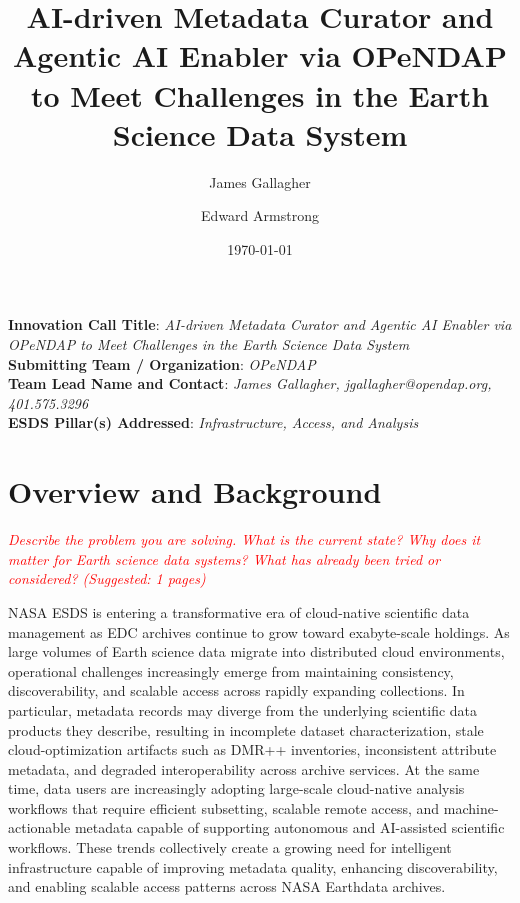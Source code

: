 \documentclass[11pt]{article}
\title{AI-driven Metadata Curator and Agentic AI Enabler via OPeNDAP to Meet Challenges in the Earth Science Data System}
\author[1]{James Gallagher}
\author[2]{Edward Armstrong}
\affil[1]{OPeNDAP, Butte, MT}
\affil[2]{NASA JPL PODAAC, Pasadena, CA}
\date{\today}
\begin{document}
% 


\lstset{basicstyle=\footnotesize\ttfamily,breaklines=true}
\lstset{framextopmargin=5pt,frame=single}

\begin{flushleft}
\noindent \textbf{Innovation Call Title}: {\em AI-driven Metadata Curator and Agentic AI Enabler via OPeNDAP to Meet Challenges in the Earth Science Data System}\\
\textbf{Submitting Team / Organization}: {\em OPeNDAP}\\
\textbf{Team Lead Name and Contact}: {\em James Gallagher, jgallagher@opendap.org, 401.575.3296}\\
\textbf{ESDS Pillar(s) Addressed}: {\em Infrastructure, Access, and Analysis}\\
\end{flushleft}


\section{Overview and Background}
\textcolor{red}{\textit{Describe the problem you are solving. What is the current state? Why does it matter for Earth science data systems? What has already been tried or considered? (Suggested: 1 pages)}}

\ac{NASA} \ac{ESDS} is entering a transformative era of cloud-native scientific data management as \ac{EDC} archives continue to grow toward exabyte-scale holdings. As large volumes of Earth science data migrate into distributed cloud environments, operational challenges increasingly emerge from maintaining consistency, discoverability, and scalable access across rapidly expanding collections. In particular, metadata records may diverge from the underlying scientific data products they describe, resulting in incomplete dataset characterization, stale cloud-optimization artifacts such as \ac{DMR++} inventories, inconsistent attribute metadata, and degraded interoperability across archive services. At the same time, data users are increasingly adopting large-scale cloud-native analysis workflows that require efficient subsetting, scalable remote access, and machine-actionable metadata capable of supporting autonomous and \ac{AI}-assisted scientific workflows. These trends collectively create a growing need for intelligent infrastructure capable of improving metadata quality, enhancing discoverability, and enabling scalable access patterns across \ac{NASA} Earthdata archives.
\end{document}
